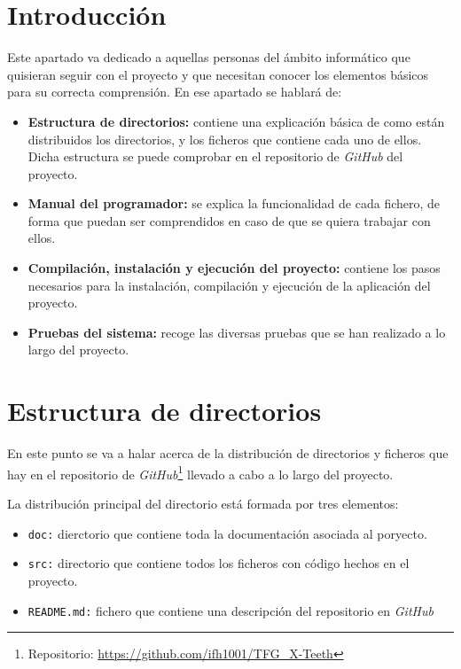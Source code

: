 
\section{Introducción}
Este apartado va dedicado a aquellas personas del ámbito informático que quisieran seguir con el proyecto y que necesitan conocer los elementos básicos para su correcta comprensión. En ese apartado se hablará de:

\begin{itemize}
    \item \textbf{Estructura de directorios:} contiene una explicación básica de como están distribuidos los directorios, y los ficheros que contiene cada uno de ellos. Dicha estructura se puede comprobar en el repositorio de \emph{GitHub} del proyecto.
    
    \item \textbf{Manual del programador:} se explica la funcionalidad de cada fichero, de forma que puedan ser comprendidos en caso de que se quiera trabajar con ellos.
    
    \item \textbf{Compilación, instalación y ejecución del proyecto:} contiene los pasos necesarios para la instalación, compilación y ejecución de la aplicación del proyecto.
    
    \item \textbf{Pruebas del sistema:} recoge las diversas pruebas que se han realizado a lo largo del proyecto. 
\end{itemize}

\section{Estructura de directorios}
En este punto se va a halar acerca de la distribución de directorios y ficheros que hay en el repositorio de \emph{GitHub}\footnote{Repositorio: \url{https://github.com/ifh1001/TFG_X-Teeth}} llevado a cabo a lo largo del proyecto.


La distribución principal del directorio está formada por tres elementos:
\begin{itemize}
    \item \texttt{doc:} dierctorio que contiene toda la documentación asociada al poryecto.
    \item \texttt{src:} directorio que contiene todos los ficheros con código hechos en el proyecto.
    \item \texttt{README.md:} fichero que contiene una descripción del repositorio en \emph{GitHub}
\end{itemize}

